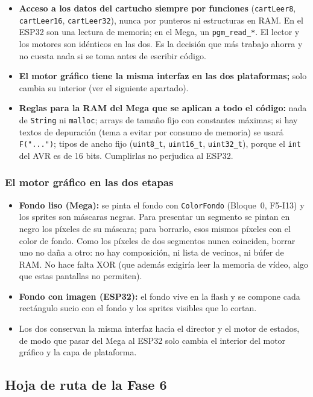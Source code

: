 \begin{itemize}
	\item \textbf{Acceso a los datos del cartucho siempre por funciones} (\texttt{cartLeer8}, \texttt{cartLeer16}, \texttt{cartLeer32}), nunca por punteros ni estructuras en RAM. En el ESP32 son una lectura de memoria; en el Mega, un \texttt{pgm\_read\_*}. El lector y los motores son idénticos en las dos. Es la decisión que más trabajo ahorra y no cuesta nada si se toma antes de escribir código.
	\item \textbf{El motor gráfico tiene la misma interfaz en las dos plataformas;} solo cambia su interior (ver el siguiente apartado).
	\item \textbf{Reglas para la RAM del Mega que se aplican a todo el código:} nada de \texttt{String} ni \texttt{malloc}; arrays de tamaño fijo con constantes máximas; si hay textos de depuración (tema a evitar por consumo de memoria) se usará \texttt{F("...")}; tipos de ancho fijo (\texttt{uint8\_t}, \texttt{uint16\_t}, \texttt{uint32\_t}), porque el \texttt{int} del AVR es de 16 bits. Cumplirlas no perjudica al ESP32.
\end{itemize}

\subsubsection{El motor gráfico en las dos etapas}

\begin{itemize}
	\item \textbf{Fondo liso (Mega):} se pinta el fondo con \texttt{ColorFondo} (Bloque~0, F5-I13) y los sprites son máscaras negras. Para presentar un segmento se pintan en negro los píxeles de su máscara; para borrarlo, esos mismos píxeles con el color de fondo. Como los píxeles de dos segmentos nunca coinciden, borrar uno no daña a otro: no hay composición, ni lista de vecinos, ni búfer de RAM. No hace falta XOR (que además exigiría leer la memoria de vídeo, algo que estas pantallas no permiten).
	\item \textbf{Fondo con imagen (ESP32):} el fondo vive en la flash y se compone cada rectángulo sucio con el fondo y los sprites visibles que lo cortan.
	\item Los dos conservan la misma interfaz hacia el director y el motor de estados, de modo que pasar del Mega al ESP32 solo cambia el interior del motor gráfico y la capa de plataforma.
\end{itemize}

\subsection{Hoja de ruta de la Fase 6}
\label{sec:F6I01Ruta}

